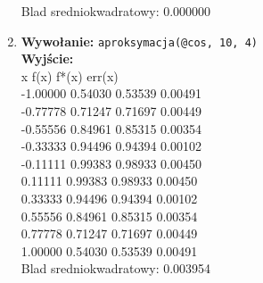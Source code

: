 \documentclass[]{article}
\begin{document}
\begin{enumerate}
    Blad sredniokwadratowy: 0.000000
\item \textbf{Wywołanie:} \verb|aproksymacja(@cos, 10, 4)|
\\\textbf{Wyjście:}\\
x \hspace{15mm}        f(x)\hspace{15mm}       f*(x)\hspace{15mm}      err(x)\\
-1.00000 \hspace{5mm}   0.54030 \hspace{5mm}   0.53539 \hspace{5mm}   0.00491\\
-0.77778 \hspace{5mm}   0.71247 \hspace{5mm}   0.71697 \hspace{5mm}   0.00449\\
-0.55556 \hspace{5mm}   0.84961 \hspace{5mm}   0.85315 \hspace{5mm}   0.00354\\
-0.33333 \hspace{5mm}   0.94496 \hspace{5mm}   0.94394 \hspace{5mm}   0.00102\\
-0.11111 \hspace{5mm}   0.99383 \hspace{5mm}   0.98933 \hspace{5mm}   0.00450\\
0.11111  \hspace{6mm}  0.99383 \hspace{5mm}   0.98933 \hspace{5mm}   0.00450\\
0.33333  \hspace{6mm}  0.94496 \hspace{5mm}   0.94394 \hspace{5mm}   0.00102\\
0.55556  \hspace{6mm}  0.84961 \hspace{5mm}   0.85315 \hspace{5mm}   0.00354\\
0.77778  \hspace{6mm}  0.71247 \hspace{5mm}   0.71697 \hspace{5mm}   0.00449\\
1.00000  \hspace{6mm}  0.54030 \hspace{5mm}   0.53539 \hspace{5mm}   0.00491\\
Blad sredniokwadratowy: 0.003954
\end{enumerate}
\end{document}
